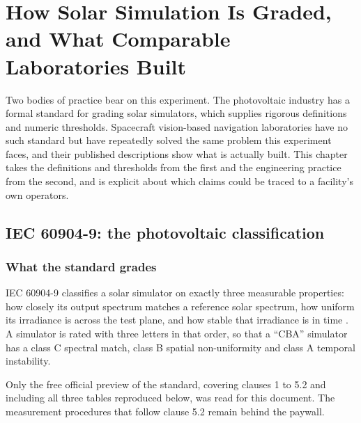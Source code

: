 \chapter{How Solar Simulation Is Graded, and What Comparable Laboratories Built}
\label{chap:sources}

Two bodies of practice bear on this experiment. The photovoltaic industry has a formal standard for grading solar simulators, which supplies rigorous definitions and numeric thresholds. Spacecraft vision-based navigation laboratories have no such standard but have repeatedly solved the same problem this experiment faces, and their published descriptions show what is actually built. This chapter takes the definitions and thresholds from the first and the engineering practice from the second, and is explicit about which claims could be traced to a facility's own operators.

\section{IEC 60904-9: the photovoltaic classification}

\subsection{What the standard grades}

IEC 60904-9 classifies a solar simulator on exactly three measurable properties: how closely its output spectrum matches a reference solar spectrum, how uniform its irradiance is across the test plane, and how stable that irradiance is in time \cite{iec60904_9_2020}. A simulator is rated with three letters in that order, so that a ``CBA'' simulator has a class C spectral match, class B spatial non-uniformity and class A temporal instability.

Only the free official preview of the standard, covering clauses 1 to 5.2 and including all three tables reproduced below, was read for this document. The measurement procedures that follow clause 5.2 remain behind the paywall.

